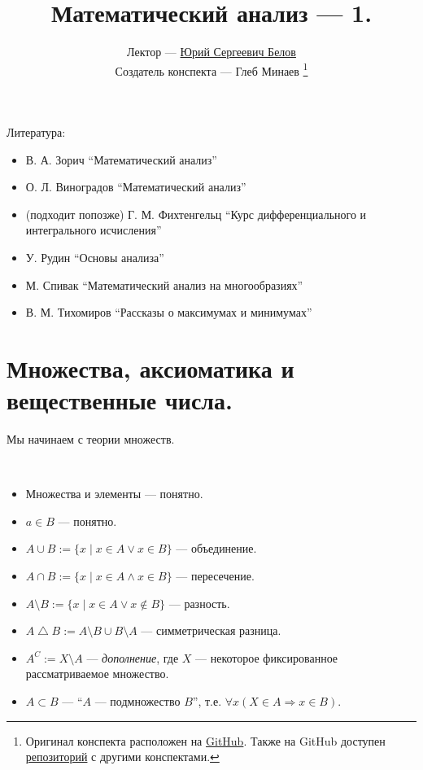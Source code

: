 \documentclass[12pt,a4paper]{article}
\title{Математический анализ --- 1.}
\author{Лектор --- \href{https://vk.com/ybelov}{Юрий Сергеевич Белов} \\
        Создатель конспекта --- Глеб Минаев
        \footnote{Оригинал конспекта расположен на \href{https://github.com/lounres/SPbU-MCS-2020-M-lecture-notes/blob/master/\%D0\%9C\%D0\%B0\%D1\%82\%D0\%90\%D0\%BD/MA.pdf}{GitHub}. Также на GitHub доступен \href{https://github.com/lounres/SPbU-MCS-2020-M-lecture-notes}{репозиторий} с другими конспектами.}}
\date{}
\begin{document}
    \maketitle

    \listoftodos[TODOs]

    \tableofcontents

    \vspace{2em}
    Литература:
    \begin{itemize}
        \item В. А. Зорич ``Математический анализ''
        \item О. Л. Виноградов ``Математический анализ''
        \item (подходит попозже) Г. М. Фихтенгельц ``Курс дифференциального и интегрального исчисления''
        \item У. Рудин ``Основы анализа''
        \item М. Спивак ``Математический анализ на многообразиях''
        \item В. М. Тихомиров ``Рассказы о максимумах и минимумах''
    \end{itemize}

    \section{Множества, аксиоматика и вещественные числа.}

    Мы начинаем с теории множеств.

    \begin{definition}\ 
        \begin{itemize}
            \item Множества и элементы --- понятно.
            \item $a \in B$ --- понятно.
            \item $A \cup B := \{x \mid x\in A \vee x\in B\}$ --- объединение.
            \item $A \cap B := \{x \mid x\in A \wedge x\in B\}$ --- пересечение.
            \item $A \setminus B := \{x \mid x\in A \vee x\notin B\}$ --- разность.
            \item $A \bigtriangleup B := A \setminus B \cup B \setminus A$ --- симметрическая разница.
            \item $A^C := X\setminus A$ --- \emph{дополнение}, где $X$ --- некоторое фиксированное рассматриваемое множество.
            \item $A \subset B$ --- ``$A$ --- подмножество $B$'', т.е. $\forall x (X\in A \Rightarrow x\in B)$.
        \end{itemize}
    \end{definition}
\end{document}
